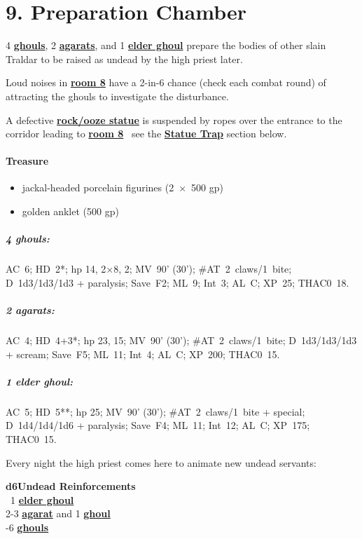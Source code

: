 \documentclass[english,11pt,openany,letterpaper,twocolumn]{book}
\begin{document}
\hypertarget{room9}{}
\section{9. Preparation Chamber}

4 \hyperlink{ghoul}{\textbf{ghouls}}, 2 \hyperlink{agarat}{\textbf{agarats}}, and 1 \hyperlink{elder-ghoul}{\textbf{elder ghoul}} prepare the bodies of other slain Traldar to be raised as undead by the high priest later.

\tab Loud noises in \hyperlink{room8}{\textbf{room 8}} have a 2-in-6 chance (check each combat round) of attracting the ghouls to investigate the disturbance.

\tab A defective \hyperlink{statue}{\textbf{rock/ooze statue}} is suspended by ropes over the entrance to the corridor leading to \hyperlink{room9}{\textbf{room 8}} \dash\ see the \hyperlink{statue-trap}{\textbf{Statue Trap}} section below.

\skipline
\paragraph{Treasure}
\begin{itemize}[leftmargin=*]
	\item jackal-headed porcelain figurines (2~×~500 gp)
	\item golden anklet (500 gp)
\end{itemize}


\begin{textbox}
	\subparagraph{4 ghouls:} AC~6; HD~2*; hp 14, 2×8, 2; MV~90' (30'); \#AT~2~claws/1~bite; D~1d3/1d3/1d3 + paralysis; Save~F2; ML~9; Int~3; AL~C; XP~25; THAC0~18.
	
	\subparagraph{2 agarats:} AC~4; HD~4+3*; hp 23, 15; MV~90' (30'); \#AT~2~claws/1~bite; D~1d3/1d3/1d3 + scream; Save~F5; ML~11; Int~4; AL~C; XP~200; THAC0~15.
	
	\subparagraph{1 elder ghoul:} AC~5; HD~5**; hp 25; MV~90' (30'); \#AT~2~claws/1~bite + special; D~1d4/1d4/1d6 + paralysis; Save~F4; ML~11; Int~12; AL~C; XP~175; THAC0~15.
\end{textbox}

	\tab Every night the high priest comes here to animate new undead servants:
	
	\ulf\textbf{d6}\tab\tab\textbf{Undead Reinforcements}\\
	~1\tab{} \hyperlink{elder-ghoul}{\textbf{elder ghoul}}\\
	2-3\tab{} \hyperlink{agarat}{\textbf{agarat}} and 1 \hyperlink{ghoul}{\textbf{ghoul}}\\
	-6\tab{} \hyperlink{ghoul}{\textbf{ghouls}}
\end{document}
